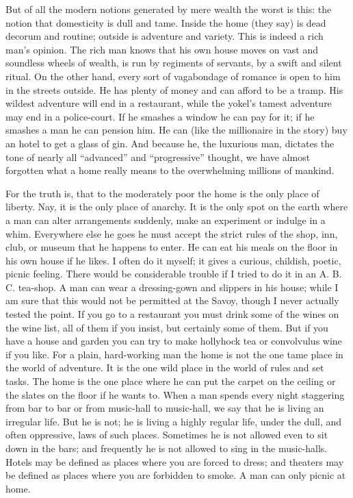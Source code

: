 \documentclass{book}
\begin{document}
But of all the modern notions generated by mere wealth the worst is this: the notion that domesticity is dull and tame. Inside the home (they say) is dead decorum and routine; outside is adventure and variety. This is indeed a rich man’s opinion. The rich man knows that his own house moves on vast and soundless wheels of wealth, is run by regiments of servants, by a swift and silent ritual. On the other hand, every sort of vagabondage of romance is open to him in the streets outside. He has plenty of money and can afford to be a tramp. His wildest adventure will end in a restaurant, while the yokel’s tamest adventure may end in a police-court. If he smashes a window he can pay for it; if he smashes a man he can pension him. He can (like the millionaire in the story) buy an hotel to get a glass of gin. And because he, the luxurious man, dictates the tone of nearly all “advanced” and “progressive” thought, we have almost forgotten what a home really means to the overwhelming millions of mankind.

For the truth is, that to the moderately poor the home is the only place of liberty. Nay, it is the only place of anarchy. It is the only spot on the earth where a man can alter arrangements suddenly, make an experiment or indulge in a whim. Everywhere else he goes he must accept the strict rules of the shop, inn, club, or museum that he happens to enter. He can eat his meals on the floor in his own house if he likes. I often do it myself; it gives a curious, childish, poetic, picnic feeling. There would be considerable trouble if I tried to do it in an A. B. C. tea-shop. A man can wear a dressing-gown and slippers in his house; while I am sure that this would not be permitted at the Savoy, though I never actually tested the point. If you go to a restaurant you must drink some of the wines on the wine list, all of them if you insist, but certainly some of them. But if you have a house and garden you can try to make hollyhock tea or convolvulus wine if you like. For a plain, hard-working man the home is not the one tame place in the world of adventure. It is the one wild place in the world of rules and set tasks. The home is the one place where he can put the carpet on the ceiling or the slates on the floor if he wants to. When a man spends every night staggering from bar to bar or from music-hall to music-hall, we say that he is living an irregular life. But he is not; he is living a highly regular life, under the dull, and often oppressive, laws of such places. Sometimes he is not allowed even to sit down in the bars; and frequently he is not allowed to sing in the music-halls. Hotels may be defined as places where you are forced to dress; and theaters may be defined as places where you are forbidden to smoke. A man can only picnic at home.
\end{document}
